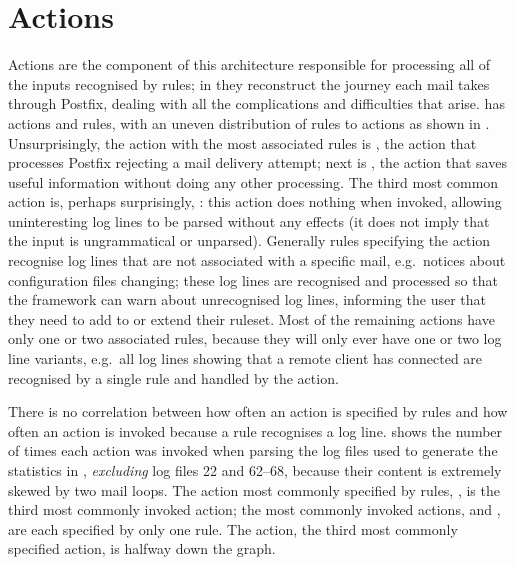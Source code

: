 \section{Actions}

\label{actions in implementation}

Actions are the component of this architecture responsible for processing
all of the inputs recognised by rules; in \parsername{} they reconstruct
the journey each mail takes through Postfix, dealing with all the
complications and difficulties that arise.  \parsername{} has
\numberOFactions{} actions and \numberOFrules{} rules, with an uneven
distribution of rules to actions as shown in .  Unsurprisingly, the action with the most associated
rules is , the action that processes Postfix
rejecting a mail delivery attempt; next is , the action
that saves useful information without doing any other processing.  The
third most common action is, perhaps surprisingly, :
this action does nothing when invoked, allowing uninteresting log lines to
be parsed without any effects (it does not imply that the input is
ungrammatical or unparsed).  Generally rules specifying the
 action recognise log lines that are not associated
with a specific mail, e.g.\ notices about configuration files changing;
these log lines are recognised and processed so that the framework can warn
about unrecognised log lines, informing the user that they need to add to
or extend their ruleset.  Most of the remaining actions have only one or
two associated rules, because they will only ever have one or two log line
variants, e.g.\ all log lines showing that a remote client has connected
are recognised by a single rule and handled by the  action.

There is no correlation between how often an action is specified by rules
and how often an action is invoked because a rule recognises a log line.
shows the number of times each action was invoked when parsing the
\numberOFlogFILES{} log files used to generate the statistics in
, \textit{excluding\/} log files 22 and
62--68, because their content is extremely skewed by two mail loops.  The
action most commonly specified by rules, , is
the third most commonly invoked action; the most commonly invoked actions,
 and , are each specified by only one
rule.  The  action, the third most commonly specified
action, is halfway down the graph.

